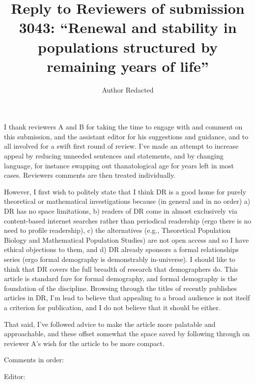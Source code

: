 \documentclass{article}
\begin{document}
\title{Reply to Reviewers of submission 3043: ``Renewal and stability in populations structured by remaining years of
life''}
\author{Author Redacted}
\maketitle

I thank reviewers A and B for taking the time to engage with and comment on this
submission, and the assistant editor for his suggestions and guidance, and to
all involved for a swift first round of review. I've made an attempt to increase
appeal by reducing unneeded sentences and statements, and by changing
language, for instance swapping out thanatological age for years left in most
cases. Reviewers comments are then treated individually.

However, I first wish to politely state that I think DR is a good home for
purely theoretical or mathematical investigations because (in general and in no
order) a) DR has no space limitations, b) readers of DR come in almost
exclusively via content-based internet searches rather than periodical
readership (ergo there is no need to profile readership), c) the alternatives
(e.g., Theoretical Population Biology and Mathematical Population Studies) are not open access and so I have ethical objections to
them, and d) DR already sponsors a formal relationships series (ergo formal demography is demonstrably in-universe). I
should like to think that DR covers the full breadth of research that
demographers do. This article is standard fare for formal demography, and formal
demography is the foundation of the discipline. Browsing through the titles of
recently publishes articles in DR, I'm lead to believe that appealing to a broad
audience is not itself a criterion for publication, and I do not believe that it
should be either.

That said, I've followed advice to make the article more palatable and
approachable, and these offset somewhat the space saved by following through on
reviewer A's wish for the article to be more compact.

Comments in order:

Editor:
\end{document}
